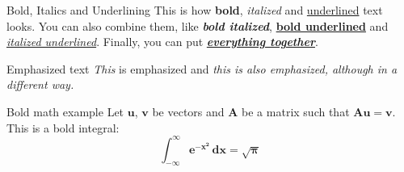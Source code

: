 \documentclass{beamer}
\begin{document}
% 
% 



\begin{frame}{Bold, Italics and Underlining}
  This is how \textbf{bold}, \textit{italized} and
  \underline{underlined} text looks.
  You can also combine them, like \textbf{\textit{bold
      italized}}, \underline{\textbf{bold underlined}} and
  \textit{\underline{italized underlined}}.
  Finally, you can put
  \textbf{\textit{\underline{everything together}}}. %
\end{frame}


\begin{frame}{Emphasized text}
  \emph{This} is emphasized and \textit{\emph{this} is
    also emphasized, although in a different way.}
\end{frame}

\begin{frame}{Bold math example}
  Let $\bm{u}$, $\bm{v}$ be vectors and $\bm{A}$ be a
  matrix such that $\bm{Au}=\bm{v}$.
  This is a bold integral:
  \[
    \bm{\int_{-\infty}^{\infty} e^{-x^2}\,dx=\sqrt{\pi} }
  \]
\end{frame}
\end{document}
